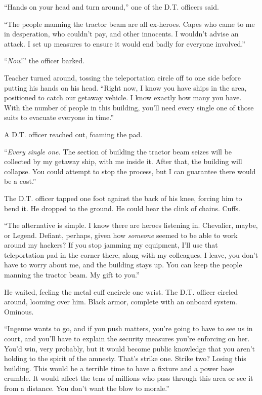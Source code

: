 ``Hands on your head and turn around,'' one of the D.T. officers said.



``The people manning the tractor beam are all ex-heroes.  Capes who came to me in desperation, who couldn't pay, and other innocents.  I wouldn't advise an attack.  I set up measures to ensure it would end badly for everyone involved.''



``\emph{Now}!'' the officer barked.



Teacher turned around, tossing the teleportation circle off to one side before putting his hands on his head.  ``Right now, I know you have ships in the area, positioned to catch our getaway vehicle.  I know exactly how many you have.  With the number of people in this building, you'll need every single one of those suits to evacuate everyone in time.''



A D.T. officer reached out, foaming the pad.



``\emph{Every single one.  }The section of building the tractor beam seizes will be collected by my getaway ship, with me inside it.  After that, the building will collapse.  You could attempt to stop the process, but I can guarantee there would be a cost.''



The D.T. officer tapped one foot against the back of his knee, forcing him to bend it.  He dropped to the ground.  He could hear the clink of chains.  Cuffs.



``The alternative is simple.  I know there are heroes listening in.  Chevalier, maybe, or Legend.  Defiant, perhaps, given how \emph{someone }seemed to be able to work around my hackers?  If you stop jamming my equipment, I'll use that teleportation pad in the corner there, along with my colleagues.  I leave, you don't have to worry about me, and the building stays up.  You can keep the people manning the tractor beam.  My gift to you.''



He waited, feeling the metal cuff encircle one wrist.  The D.T. officer circled around, looming over him.  Black armor, complete with an onboard system.  Ominous.



``Ingenue wants to go, and if you push matters, you're going to have to see us in court, and you'll have to explain the security measures you're enforcing on her.   You'd win, very probably, but it would become public knowledge that you aren't holding to the spirit of the amnesty.  That's strike one.  Strike two?  Losing this building.  This would be a terrible time to have a fixture and a power base crumble.  It would affect the tens of millions who pass through this area or see it from a distance.  You don't want the blow to morale.''




